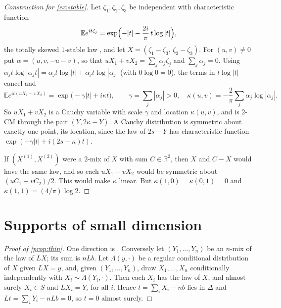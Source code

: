 \documentclass[11pt]{article}
\theoremstyle{definition}
\theoremstyle{remark}
\newcommand{\R}{\mathbb{R}}
\newcommand{\E}{\mathbb{E}}
\begin{document}
\begin{proof}[Construction for \cref{ex:stable}]
Let $\zeta_1,\zeta_2,\zeta_3$ be independent with characteristic function
\[
\E e^{it\zeta_j}=\exp\Bigl(-|t|-\frac{2i}{\pi}\,t\log|t|\Bigr),
\]
the totally skewed $1$-stable law \cite[Section~1.1]{ST}, and let $X=(\zeta_1-\zeta_3,\,\zeta_2-\zeta_3)$. For $(u,v)\ne0$ put
$\alpha=(u,v,-u-v)$, so that $uX_1+vX_2=\sum_j\alpha_j\zeta_j$ and $\sum_j\alpha_j=0$. Using
$\alpha_jt\log|\alpha_jt|=\alpha_jt\log|t|+\alpha_jt\log|\alpha_j|$ (with $0\log0=0$), the terms in $t\log|t|$
cancel and
\[
\E e^{it(uX_1+vX_2)}=\exp\bigl(-\gamma|t|+i\kappa t\bigr),\qquad
\gamma=\sum_j|\alpha_j|>0,\quad \kappa(u,v)=-\frac2\pi\sum_j\alpha_j\log|\alpha_j| .
\]
So $uX_1+vX_2$ is a Cauchy variable with scale $\gamma$ and location $\kappa(u,v)$, and is $2$-CM through the pair
$(Y,2\kappa-Y)$. A Cauchy distribution is symmetric about exactly one point, its location, since the law of $2s-Y$
has characteristic function $\exp(-\gamma|t|+i(2s-\kappa)t)$.

If $(X^{(1)},X^{(2)})$ were a $2$-mix of $X$ with sum $C\in\R^2$, then $X$ and $C-X$ would have the same law, and so
each $uX_1+vX_2$ would be symmetric about $(uC_1+vC_2)/2$. This would make $\kappa$ linear. But $\kappa(1,0)=
\kappa(0,1)=0$ and $\kappa(1,1)=(4/\pi)\log2$.
\end{proof}

\section{Supports of small dimension}\label{sec:thin}

\begin{proof}[Proof of \cref{prop:thin}]
One direction is \cite[Proposition~6]{Wang}. Conversely let $(Y_1,\dots,Y_n)$ be an $n$-mix of the law of $LX$; its
sum is $nLb$. Let $\Lambda(y,\cdot)$ be a regular conditional distribution of $X$ given $LX=y$, and, given
$(Y_1,\dots,Y_n)$, draw $X_1,\dots,X_n$ conditionally independently with $X_i\sim\Lambda(Y_i,\cdot)$. Then each
$X_i$ has the law of $X$, and almost surely $X_i\in S$ and $LX_i=Y_i$ for all $i$. Hence $t=\sum_iX_i-nb$ lies in
$\Delta$ and $Lt=\sum_iY_i-nLb=0$, so $t=0$ almost surely.
\end{proof}
\end{document}

